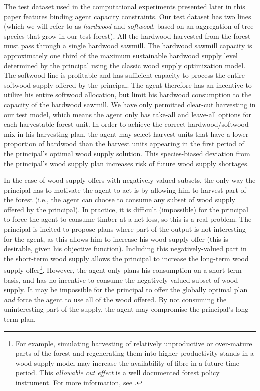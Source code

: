 The test dataset used in the computational experiments presented later in this paper features binding agent capacity constraints.
Our test dataset has two lines (which we will refer to as \emph{hardwood} and \emph{softwood}, based on an aggregation of tree species that grow in our test forest).
All the hardwood harvested from the forest must pass through a single hardwood sawmill.
The hardwood sawmill capacity is approximately one third of the maximum sustainable hardwood supply level determined by the principal using the classic wood supply optimization model.
The softwood line is profitable and has sufficient capacity to process the entire softwood supply offered by the principal.
The agent therefore has an incentive to utilize his entire softwood allocation, but limit his hardwood consumption to the capacity of the hardwood sawmill.
We have only permitted clear-cut harvesting in our test model, which means the agent only has take-all and leave-all options for each harvestable forest unit.
In order to achieve the correct hardwood/softwood mix in his harvesting plan, the agent may select harvest units that have a lower proportion of hardwood than the harvest units appearing in the first period of the principal's optimal wood supply solution.
This species-biased deviation from the principal's wood supply plan increases risk of future wood supply shortages.

In the case of wood supply offers with negatively-valued subsets, the only way the principal has to motivate the agent to act is by allowing him to harvest part of the forest (i.e., the agent can choose to consume any subset of wood supply offered by the principal). 
In practice, it is difficult (impossible) for the principal to force the agent to consume timber at a net loss, so this is a real problem. 
The principal is incited to propose plans where part of the output is not interesting for the agent, as this allows him to increase his wood supply offer (this is desirable, given his objective function). 
Including this negatively-valued part in the short-term wood supply allows the principal to increase the long-term wood supply offer\footnote{For example, simulating harvesting of relatively unproductive or over-mature parts of the forest and regenerating them into higher-productivity stands in a wood supply model may increase the availability of fibre in a future time period. This \emph{allowable cut effect} is a well documented forest policy instrument. For more information, see \citet{luckert1995allowable}.}.
However, the agent only plans his consumption on a short-term basis, and has no incentive to consume the negatively-valued subset of wood supply.
It may be impossible for the principal to offer the globally optimal plan \emph{and} force the agent to use all of the wood offered. 
By not consuming the uninteresting part of the supply, the agent may compromise the principal's long term plan.

